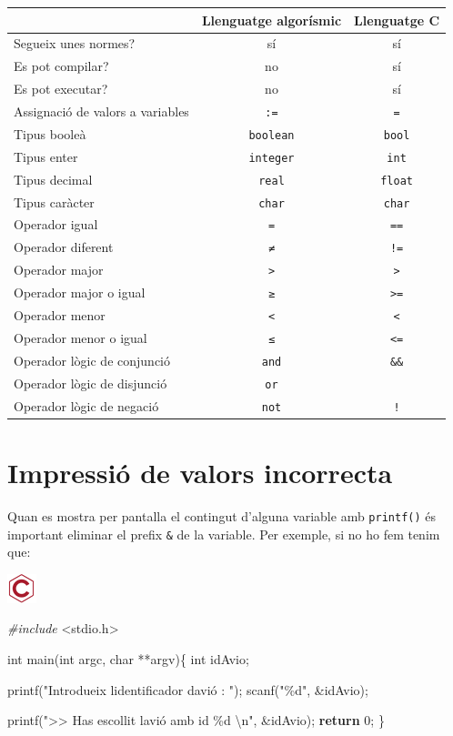 \documentclass[
]{book}
\newenvironment{Shaded}{\begin{snugshade}}{\end{snugshade}}
\newcommand{\ControlFlowTok}[1]{\textcolor[rgb]{0.13,0.29,0.53}{\textbf{#1}}}
\newcommand{\DataTypeTok}[1]{\textcolor[rgb]{0.13,0.29,0.53}{#1}}
\newcommand{\DecValTok}[1]{\textcolor[rgb]{0.00,0.00,0.81}{#1}}
\newcommand{\ImportTok}[1]{#1}
\newcommand{\NormalTok}[1]{#1}
\newcommand{\PreprocessorTok}[1]{\textcolor[rgb]{0.56,0.35,0.01}{\textit{#1}}}
\newcommand{\SpecialCharTok}[1]{\textcolor[rgb]{0.00,0.00,0.00}{#1}}
\newcommand{\StringTok}[1]{\textcolor[rgb]{0.31,0.60,0.02}{#1}}
\begin{document}
\begin{longtable}[]{@{}lcc@{}}
\toprule
& Llenguatge algorísmic & Llenguatge C\tabularnewline
\midrule
\endhead
Segueix unes normes? & sí & sí\tabularnewline
Es pot compilar? & no & sí\tabularnewline
Es pot executar? & no & sí\tabularnewline
Assignació de valors a variables & \texttt{:=} & \texttt{=}\tabularnewline
Tipus booleà & \texttt{boolean} & \texttt{bool}\tabularnewline
Tipus enter & \texttt{integer} & \texttt{int}\tabularnewline
Tipus decimal & \texttt{real} & \texttt{float}\tabularnewline
Tipus caràcter & \texttt{char} & \texttt{char}\tabularnewline
Operador igual & \texttt{=} & \texttt{==}\tabularnewline
Operador diferent & \texttt{≠} & \texttt{!=}\tabularnewline
Operador major & \texttt{\textgreater{}} & \texttt{\textgreater{}}\tabularnewline
Operador major o igual & \texttt{≥} & \texttt{\textgreater{}=}\tabularnewline
Operador menor & \texttt{\textless{}} & \texttt{\textless{}}\tabularnewline
Operador menor o igual & \texttt{≤} & \texttt{\textless{}=}\tabularnewline
Operador lògic de conjunció & \texttt{and} & \texttt{\&\&}\tabularnewline
Operador lògic de disjunció & \texttt{or} & \texttt{\textbar{}\textbar{}}\tabularnewline
Operador lògic de negació & \texttt{not} & \texttt{!}\tabularnewline
\bottomrule
\end{longtable}

\hypertarget{impressiuxf3-de-valors-incorrecta}{%
\section{Impressió de valors incorrecta}\label{impressiuxf3-de-valors-incorrecta}}

Quan es mostra per pantalla el contingut d'alguna variable amb \texttt{printf()} és important eliminar el prefix \texttt{\&} de la variable. Per exemple, si no ho fem tenim que:

\includegraphics{./img/c_err.png}

\begin{Shaded}
\begin{Highlighting}[]
\PreprocessorTok{\#include }\ImportTok{\textless{}stdio.h\textgreater{}}

\DataTypeTok{int}\NormalTok{ main(}\DataTypeTok{int}\NormalTok{ argc, }\DataTypeTok{char}\NormalTok{ **argv)\{}
    \DataTypeTok{int}\NormalTok{ idAvio;}

\NormalTok{    printf(}\StringTok{"Introdueix l\textquotesingle{}identificador d\textquotesingle{}avió : "}\NormalTok{);}
\NormalTok{    scanf(}\StringTok{"\%d"}\NormalTok{, \&idAvio);}
    
\NormalTok{    printf(}\StringTok{"\textgreater{}\textgreater{} Has escollit l\textquotesingle{}avió amb id \%d }\SpecialCharTok{\textbackslash{}n}\StringTok{"}\NormalTok{, \&idAvio);}
    \ControlFlowTok{return} \DecValTok{0}\NormalTok{;}
\NormalTok{\}}
\end{Highlighting}
\end{Shaded}
\end{document}
